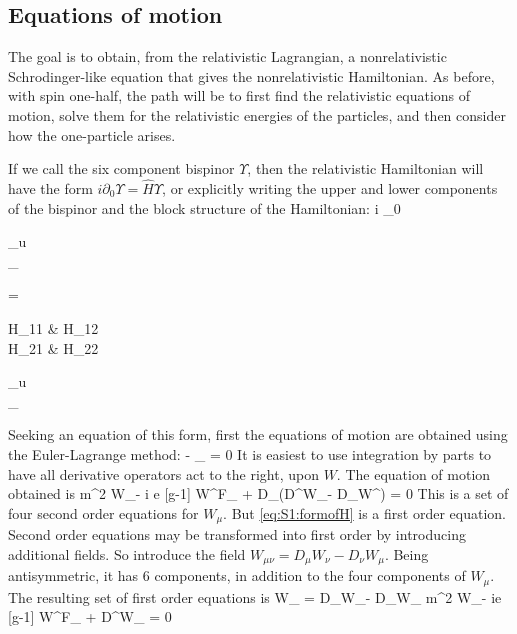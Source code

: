 \subsection{Equations of motion}
The goal is to obtain, from the relativistic Lagrangian, a nonrelativistic Schrodinger-like equation that gives the nonrelativistic Hamiltonian.  As before, with spin one-half, the path will be to first find the relativistic equations of motion, solve them for the relativistic energies of the particles, and then consider how the one-particle arises.


If we call the six component bispinor $\Upsilon$, then the relativistic Hamiltonian will have the form $i \partial_0 \Upsilon = \hat{H} \Upsilon$, or explicitly writing the upper and lower components of the bispinor and the block structure of the Hamiltonian:
\beq \label{eq:S1:formofH}
	i \partial_0 \begin{pmatrix} \Upsilon_u \\ \Upsilon_\ell \end{pmatrix} 
		= \begin{pmatrix} H_{11} & H_{12} \\ H_{21} & H_{22} \end{pmatrix} \begin{pmatrix} \Upsilon_u \\ \Upsilon_\ell \end{pmatrix}
\eeq 


Seeking an equation of this form, first the equations of motion are obtained using the Euler-Lagrange method:
\beq
	 - \partial_\mu {} = 0
\eeq
It is easiest to use integration by parts to have all derivative operators act to the right, upon $W$.  The equation of motion obtained is
\beq \label{eq:S1:ELeq}
		m^2 W_\alpha - i e [g-1] W^\nu F_{\alpha \nu} + D_\mu (D^\mu W_\alpha - D_\alpha W^\mu) = 0
\eeq
This is a set of four second order equations for $W_\mu$.  But \eqref{eq:S1:formofH} is a first order equation.  Second order equations may be transformed into first order by introducing additional fields.  So introduce the field $W_{\mu\nu} = D_\mu W_\nu - D_\nu W_\mu$.  Being antisymmetric, it has 6 components, in addition to the four components of $W_\mu$.  The resulting set of first order equations is
\beq \label{eq:S1:ELeqA}
	W_{\mu\nu} = D_\mu W_\nu - D_\nu W_\mu
\eeq
\beq \label{eq:S1:ELeqB}
	m^2 W_\alpha - ie [g-1] W^\nu F_{\alpha \nu} + D^\mu W_{\mu \alpha} = 0	
\eeq

